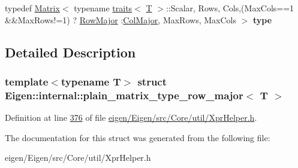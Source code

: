 \begin{DoxyCompactItemize}
\item 
\mbox{\label{struct_eigen_1_1internal_1_1plain__matrix__type__row__major_a0b9ddb023beca38784f402c4a5836982}} 
typedef \hyperlink{group___core___module_class_eigen_1_1_matrix}{Matrix}$<$ typename \hyperlink{struct_eigen_1_1internal_1_1traits}{traits}$<$ \hyperlink{group___sparse_core___module}{T} $>$\+::Scalar, Rows, Cols,(Max\+Cols==1 \&\&Max\+Rows!=1) ? \hyperlink{group__enums_ggaacded1a18ae58b0f554751f6cdf9eb13acfcde9cd8677c5f7caf6bd603666aae3}{Row\+Major} \+:\hyperlink{group__enums_ggaacded1a18ae58b0f554751f6cdf9eb13a0cbd4bdd0abcfc0224c5fcb5e4f6669a}{Col\+Major}, Max\+Rows, Max\+Cols $>$ {\bfseries type}
\end{DoxyCompactItemize}


\subsection{Detailed Description}
\subsubsection*{template$<$typename T$>$\newline
struct Eigen\+::internal\+::plain\+\_\+matrix\+\_\+type\+\_\+row\+\_\+major$<$ T $>$}



Definition at line \hyperlink{eigen_2_eigen_2src_2_core_2util_2_xpr_helper_8h_source_l00376}{376} of file \hyperlink{eigen_2_eigen_2src_2_core_2util_2_xpr_helper_8h_source}{eigen/\+Eigen/src/\+Core/util/\+Xpr\+Helper.\+h}.



The documentation for this struct was generated from the following file\+:\begin{DoxyCompactItemize}
\item 
eigen/\+Eigen/src/\+Core/util/\+Xpr\+Helper.\+h\end{DoxyCompactItemize}
